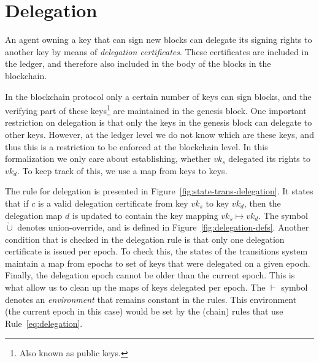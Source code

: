 \documentclass[11pt,a4paper]{article}
\newcommand{\unionoverride}{\mathbin{\underrightarrow\cup}}
\newcommand{\var}[1]{\mathit{#1}}
\begin{document}
\section{Delegation}
\label{sec:delegation}

An agent owning a key that can sign new blocks can delegate its signing rights
to another key by means of \textit{delegation certificates}. These certificates
are included in the ledger, and therefore also included in the body of the
blocks in the blockchain.

In the blockchain protocol only a certain number of keys can sign blocks, and
the verifying part of these keys\footnote{Also known as public keys.} are
maintained in the genesis block. One important restriction on delegation is
that only the keys in the genesis block can delegate to other keys. However, at
the ledger level we do not know which are these keys, and thus this is a
restriction to be enforced at the blockchain level. In this formalization we
only care about establishing, whether $\var{vk}_s$ delegated its rights to
$\var{vk}_d$. To keep track of this, we use a map from keys to keys.

The rule for delegation is presented in
Figure~\ref{fig:state-trans-delegation}. It states that if $\var{c}$ is a valid
delegation certificate from key $\var{vk}_s$ to key $\var{vk}_d$, then the
delegation map $d$ is updated to contain the key mapping
$\var{vk}_s \mapsto \var{vk}_d$. The symbol $\unionoverride$ denotes
union-override, and is defined in Figure~\ref{fig:delegation-defs}. Another
condition that is checked in the delegation rule is that only one delegation
certificate is issued per epoch. To check this, the states of the transitions
system maintain a map from epochs to set of keys that were delegated on a given
epoch. Finally, the delegation epoch cannot be older than the current epoch.
This is what allow us to clean up the maps of keys delegated per epoch. The
$\vdash$ symbol denotes an \textit{environment} that remains constant in the
rules. This environment (the current epoch in this case) would be set by the
(chain) rules that use Rule~\ref{eq:delegation}.
\end{document}
